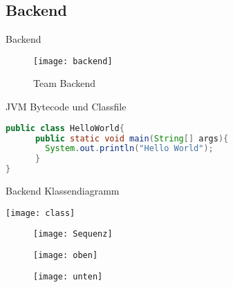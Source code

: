 \subsection{Backend}

\begin{frame}[fragile]{Backend}
	\begin{figure}
	  \begin{center}
	    \leavevmode
	      \texttt{[image: backend]}
	    \caption{Team Backend}
	  \end{center}
	\end{figure}
\end{frame}

\begin{frame}[fragile]{JVM Bytecode und Classfile}
\begin{lstlisting}[language=Java]
public class HelloWorld{
	  public static void main(String[] args){
	    System.out.println("Hello World");
	  }	
}
\end{lstlisting}
\end{frame}

\begin{frame}[fragile]{Backend Klassendiagramm}
\begin{center}
\texttt{[image: class]}
\end{center}
\end{frame}

\begin{frame}
\begin{figure}[htp]
\begin{center}
\texttt{[image: Sequenz]}
\end{center}
\end{figure}
\end{frame}

\begin{frame}
\begin{figure}[htp]
\begin{center}
\texttt{[image: oben]}
\end{center}
\end{figure}
\end{frame}

\begin{frame}
\begin{figure}[htp]
\begin{center}
\texttt{[image: unten]}
\end{center}
\end{figure}
\end{frame}


